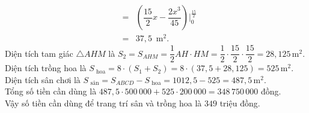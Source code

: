 \begin{bt}
{\begin{eqnarray*}
			& = & \left(\dfrac{15}{2}x  - \dfrac{2x^3}{45}\right)\Big|_{0}^{\tfrac{15}{2}}\\
			&=&  37{,}5\,\text{ m}^2.
		\end{eqnarray*}
		Diện tích tam giác $\triangle AHM$ là $S_2 = S_{AHM} = \dfrac{1}{2}AH \cdot HM = \dfrac{1}{2}  \cdot \dfrac{15}{2} \cdot \dfrac{15}{2} = 28{,}125$\,m$^2$.\\
		Diện tích trồng hoa là $S_{\text{ hoa}} = 8\cdot (S_1+S_2) = 8\cdot (37{,}5+28{,}125)  = 525$\,m$^2$.\\
		Diện tích sân chơi là  $S_{\text{ sân}} = S_{ABCD} - S_{\text{ hoa}} = 1012{,}5 - 525 = 487{,}5$\,m$^2$.\\
		Tổng số tiền cần dùng là $487{,}5 \cdot 500\,000 + 525 \cdot 200\,000 = 348\,750\,000$ đồng.\\ 
		Vậy số tiền cần dùng để trang trí  sân và trồng hoa là $349$ triệu đồng.
	 }
\end{bt}

